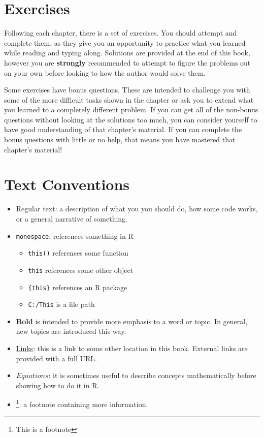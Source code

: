 \documentclass[]{book}
\providecommand{\tightlist}{%
  \setlength{\itemsep}{0pt}\setlength{\parskip}{0pt}}
\let\rmarkdownfootnote\footnote%
\def\footnote{\protect\rmarkdownfootnote}
\theoremstyle{definition}
\theoremstyle{definition}
\theoremstyle{definition}
\theoremstyle{remark}
\begin{document}
\section*{Exercises}\label{exercises}

Following each chapter, there is a set of exercises. You should attempt
and complete them, as they give you an opportunity to practice what you
learned while reading and typing along. Solutions are provided at the
end of this book, however you are \textbf{strongly} recommended to
attempt to figure the problems out on your own before looking to how the
author would solve them.

Some exercises have bonus questions. These are intended to challenge you
with some of the more difficult tasks shown in the chapter or ask you to
extend what you learned to a completely different problem. If you can
get all of the non-bonus questions without looking at the solutions too
much, you can consider yourself to have good understanding of that
chapter's material. If you can complete the bonus questions with little
or no help, that means you have mastered that chapter's material!

\hypertarget{notation}{\section*{Text Conventions}\label{notation}}

\begin{itemize}
\tightlist
\item
  Regular text: a description of what you you should do, how some code
  works, or a general narrative of something.
\item
  \texttt{monospace}: references something in R

  \begin{itemize}
  \tightlist
  \item
    \texttt{this()} references some function
  \item
    \texttt{this} references some other object
  \item
    \texttt{\{this\}} references an R package
  \item
    \texttt{C:/This} is a file path
  \end{itemize}
\item
  \textbf{Bold} is intended to provide more emphasis to a word or topic.
  In general, new topics are introduced this way.
\item
  \protect\hyperlink{notation}{Links}: this is a link to some other
  location in this book. External links are provided with a full URL.
\item
  \(Equations\): it is sometimes useful to describe concepts
  mathematically before showing how to do it in R.
\item
  \footnote{This is a footnote}: a footnote containing more information.
\end{itemize}
\end{document}
